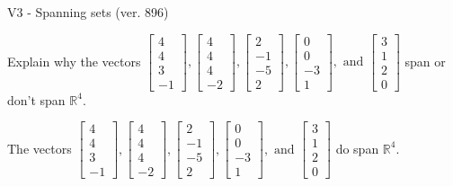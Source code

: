 \begin{exercise}
  \begin{exerciseTitle}V3 - Spanning sets (ver. 896)\end{exerciseTitle}
  \begin{exerciseStatement}
    Explain why the vectors \(\left[\begin{array}{r}
4 \\
4 \\
3 \\
-1
\end{array}\right] , \left[\begin{array}{r}
4 \\
4 \\
4 \\
-2
\end{array}\right] , \left[\begin{array}{r}
2 \\
-1 \\
-5 \\
2
\end{array}\right] , \left[\begin{array}{r}
0 \\
0 \\
-3 \\
1
\end{array}\right] , \text{ and } \left[\begin{array}{r}
3 \\
1 \\
2 \\
0
\end{array}\right]\) span or don't span \(\mathbb{R}^4\). 
	


  \end{exerciseStatement}
  \begin{exerciseAnswer}
   The vectors \(\left[\begin{array}{r}
4 \\
4 \\
3 \\
-1
\end{array}\right] , \left[\begin{array}{r}
4 \\
4 \\
4 \\
-2
\end{array}\right] , \left[\begin{array}{r}
2 \\
-1 \\
-5 \\
2
\end{array}\right] , \left[\begin{array}{r}
0 \\
0 \\
-3 \\
1
\end{array}\right] , \text{ and } \left[\begin{array}{r}
3 \\
1 \\
2 \\
0
\end{array}\right]\) 
  	 do  
	span \(\mathbb{R}^4\).
  


  \end{exerciseAnswer}
\end{exercise}